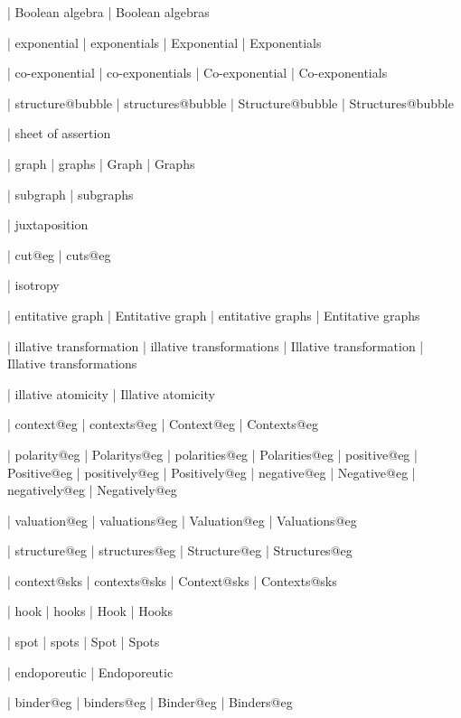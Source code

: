  | Boolean algebra
 | Boolean algebras

 | exponential
 | exponentials
 | Exponential
 | Exponentials

 | co-exponential
 | co-exponentials
 | Co-exponential
 | Co-exponentials

 | structure@bubble
 | structures@bubble
 | Structure@bubble
 | Structures@bubble


 | sheet of assertion
 
 | graph
 | graphs
 | Graph
 | Graphs

 | subgraph
 | subgraphs

 | juxtaposition

 | cut@eg
 | cuts@eg

 | isotropy

 | entitative graph
 | Entitative graph
 | entitative graphs
 | Entitative graphs

 | illative transformation
 | illative transformations
 | Illative transformation
 | Illative transformations

 | illative atomicity
 | Illative atomicity
 
 | context@eg
 | contexts@eg
 | Context@eg
 | Contexts@eg

 | polarity@eg
 | Polaritys@eg
 | polarities@eg
 | Polarities@eg
 | positive@eg
 | Positive@eg
 | positively@eg
 | Positively@eg
 | negative@eg
 | Negative@eg
 | negatively@eg
 | Negatively@eg

 | valuation@eg
 | valuations@eg
 | Valuation@eg
 | Valuations@eg

 | structure@eg
 | structures@eg
 | Structure@eg
 | Structures@eg

 | context@sks
 | contexts@sks
 | Context@sks
 | Contexts@sks

 | hook
 | hooks
 | Hook
 | Hooks

 | spot
 | spots
 | Spot
 | Spots
 
 | endoporeutic
 | Endoporeutic

 | binder@eg
 | binders@eg
 | Binder@eg
 | Binders@eg


